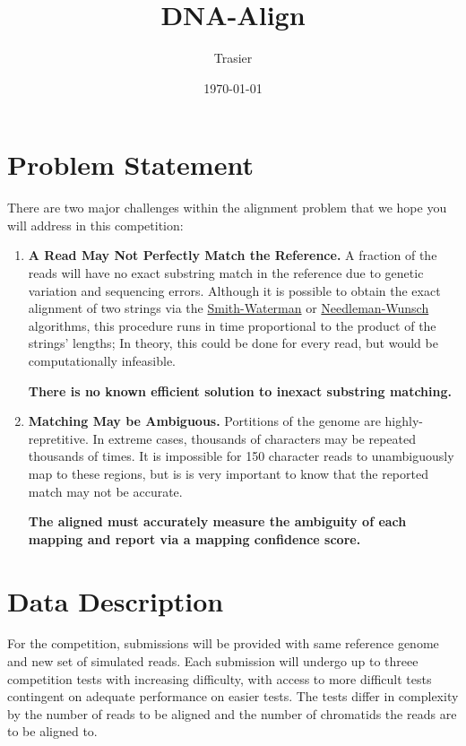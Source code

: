 \documentclass[hyperref,UTF8]{ctexart}
\theoremstyle{definition}
\theoremstyle{remark}
\numberwithin{equation}{subsection}
\newcommand{\Emph}{\textbf}
\begin{document}
\title{\Huge DNA-Align}
\vspace{2cm}
\author{\Large Trasier}
\date{\today}
\maketitle

\section{Problem Statement}
\label{sec:problem_statement}
	
	There are two major challenges within the alignment problem that we hope you will address in this competition:
	\begin{enumerate}
	
		\item \Emph{A Read May Not Perfectly Match the Reference.}
		A fraction of the reads will have no exact substring match in the reference due to genetic
		variation and sequencing errors.
		Although it is possible to obtain the exact alignment of two strings via the
        \href{https://en.wikipedia.org/wiki/Smith-Waterman_algorithm}{Smith-Waterman} or
        \href{https://en.wikipedia.org/wiki/Needleman-Wunsch_algorithm}{Needleman-Wunsch}
		algorithms, this procedure runs in time proportional to the product of the strings' lengths;
		In theory, this could be done for every read, but would be computationally infeasible.
		
		\Emph{There is no known efficient solution to inexact substring matching.}
		
		\item \Emph{Matching May be Ambiguous.}
		Portitions of the genome are highly-repretitive.
		In extreme cases, thousands of characters may be repeated thousands of times.
		It is impossible for 150 character reads to unambiguously map to these regions,
		but is is very important to know that the reported match may not be accurate.
		
		\Emph{The aligned must accurately measure the ambiguity of each mapping and report via a mapping confidence score.}
		
	\end{enumerate}

	
\section{Data Description}
	
	For the competition, submissions will be provided with same reference genome and new set of simulated reads.
	Each submission will undergo up to threee competition tests with increasing difficulty,
	with access to more difficult tests contingent on adequate performance on easier tests.
	The tests differ in complexity by the number of reads to be aligned and
	the number of chromatids the reads are to be aligned to.
	
\end{document}
